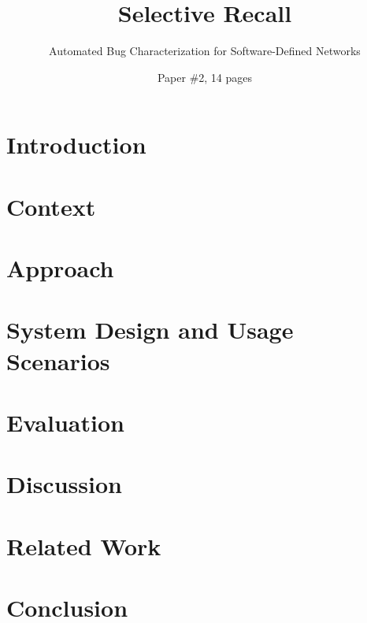 \documentclass{sig-alternate-10pt}
\begin{document}
    \date{}

\title{Selective Recall}
\subtitle{Automated Bug Characterization for Software-Defined Networks}
    \author{Paper \#2, 14 pages}
    \maketitle
   \thispagestyle{empty}

%

\abstract{{\it }}

\section{Introduction}
\label{sec:intro}


\section{Context}
\label{sec:overview}


\section{Approach}
\label{sec:approach}


\section{System Design and Usage Scenarios}
\label{sec:architecture}


\section{Evaluation}
\label{sec:evaluation}


\section{Discussion}
\label{sec:discussion}


\section{Related Work}
\label{sec:related_work}


\section{Conclusion}
\label{sec:conclusion}



 
%

\end{document}
